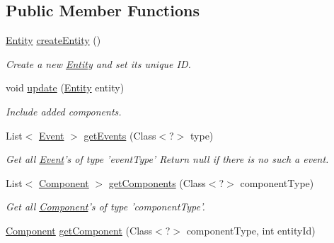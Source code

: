 \subsection*{Public Member Functions}
\begin{DoxyCompactItemize}
\item 
\hyperlink{classbr_1_1unb_1_1unbomber_1_1core_1_1_entity}{Entity} \hyperlink{interfacebr_1_1unb_1_1unbomber_1_1core_1_1_entity_manager_ac46fec4c16bfb9f580e18e3f57625d68}{create\+Entity} ()
\begin{DoxyCompactList}\small\item\em Create a new \hyperlink{classbr_1_1unb_1_1unbomber_1_1core_1_1_entity}{Entity} and set its unique I\+D. \end{DoxyCompactList}\item 
void \hyperlink{interfacebr_1_1unb_1_1unbomber_1_1core_1_1_entity_manager_a2843eea2e05f790f2d6be258bf00da9e}{update} (\hyperlink{classbr_1_1unb_1_1unbomber_1_1core_1_1_entity}{Entity} entity)
\begin{DoxyCompactList}\small\item\em Include added components. \end{DoxyCompactList}\item 
List$<$ \hyperlink{classbr_1_1unb_1_1unbomber_1_1core_1_1_event}{Event} $>$ \hyperlink{interfacebr_1_1unb_1_1unbomber_1_1core_1_1_entity_manager_a92ba047c17c6463ac9e62b7f1442db37}{get\+Events} (Class$<$?$>$ type)
\begin{DoxyCompactList}\small\item\em Get all \hyperlink{classbr_1_1unb_1_1unbomber_1_1core_1_1_event}{Event}'s of type 'event\+Type' Return null if there is no such a event. \end{DoxyCompactList}\item 
List$<$ \hyperlink{classbr_1_1unb_1_1unbomber_1_1core_1_1_component}{Component} $>$ \hyperlink{interfacebr_1_1unb_1_1unbomber_1_1core_1_1_entity_manager_af35dee4f13fea62516bbf5d614025564}{get\+Components} (Class$<$?$>$ component\+Type)
\begin{DoxyCompactList}\small\item\em Get all \hyperlink{classbr_1_1unb_1_1unbomber_1_1core_1_1_component}{Component}'s of type 'component\+Type'. \end{DoxyCompactList}\item 
\hyperlink{classbr_1_1unb_1_1unbomber_1_1core_1_1_component}{Component} \hyperlink{interfacebr_1_1unb_1_1unbomber_1_1core_1_1_entity_manager_aa4ec6392897e0996b3fc1766837473cc}{get\+Component} (Class$<$?$>$ component\+Type, int entity\+Id)

\end{DoxyCompactItemize}
